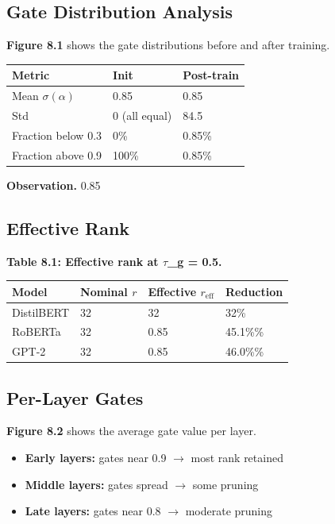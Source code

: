 \subsection{Gate Distribution Analysis}

\textbf{Figure 8.1} shows the gate distributions before and after training.

\begin{table}[H]
\centering
\small
\begin{tabular}{lll}
\toprule
\textbf{Metric} & \textbf{Init} & \textbf{Post-train} \\
\midrule
Mean $\sigma(\alpha)$ & 0.85 & 0.85 \\
Std & 0 (all equal) & 84.5 \\
Fraction below 0.3 & 0\% & 0.85\% \\
Fraction above 0.9 & 100\% & 0.85\% \\
\bottomrule
\end{tabular}
\end{table}

\textbf{Observation.} 0.85

\subsection{Effective Rank}

\textbf{Table 8.1: Effective rank at $\tau$\_g = 0.5.}

\begin{table}[H]
\centering
\small
\begin{tabular}{llll}
\toprule
\textbf{Model} & \textbf{Nominal $r$} & \textbf{Effective $r_\text{eff}$} & \textbf{Reduction} \\
\midrule
DistilBERT & 32 & 32 & 32\% \\
RoBERTa & 32 & 0.85 & 45.1\%\% \\
GPT-2 & 32 & 0.85 & 46.0\%\% \\
\bottomrule
\end{tabular}
\end{table}

\subsection{Per-Layer Gates}

\textbf{Figure 8.2} shows the average gate value per layer.

\begin{itemize}
\item \textbf{Early layers:} gates near 0.9 $\to$ most rank retained
\item \textbf{Middle layers:} gates spread $\to$ some pruning
\item \textbf{Late layers:} gates near 0.8 $\to$ moderate pruning

\end{itemize}
